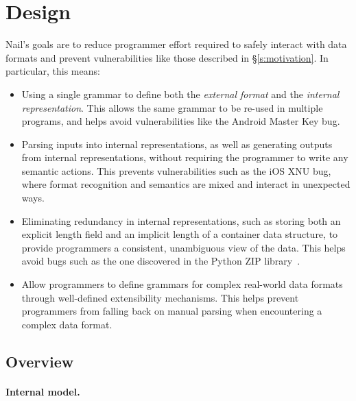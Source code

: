 \section{Design}
\label{s:design}

Nail's goals are to reduce programmer effort required to safely interact with data formats and
prevent vulnerabilities like those described in \S\ref{s:motivation}. In particular, this means:

\begin{itemize}


\item Using a single grammar to define both the \emph{external format} and the
  \emph{internal representation}.  This allows the same grammar to be re-used
  in multiple programs, and helps avoid vulnerabilities like the Android Master
  Key bug.

\item Parsing inputs into internal representations, as well as
      generating outputs from internal representations, without
      requiring the programmer to write any semantic actions. This prevents
      vulnerabilities such as the iOS XNU bug, where format recognition and semantics
      are mixed and interact in unexpected ways.

\item Eliminating redundancy in internal representations, such as
      storing both an explicit length field and an implicit length
      of a container data structure, to provide programmers
      a consistent, unambiguous view of the data.
      This helps avoid bugs such as the one discovered in the
      Python ZIP library~\cite{python-bug:20078}.

\item Allow programmers to define grammars for complex real-world
      data formats through well-defined extensibility mechanisms. 
      This helps prevent programmers from falling back on manual
      parsing when encountering a complex data format.

\end{itemize}


\subsection{Overview}

\paragraph{Internal model.}

